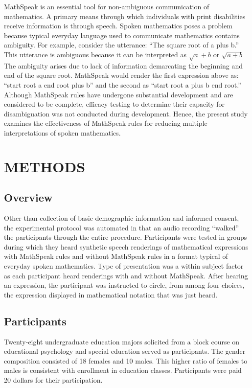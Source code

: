 \documentclass[11.5pt]{sig-alternate} %
\begin{document}
\begin{large}
MathSpeak is an essential tool for non-ambiguous communication of mathematics. A primary means through which individuals with print disabilities receive information is through speech. Spoken mathematics poses a problem because typical everyday language used to communicate mathematics contains ambiguity. For example, consider the utterance: “The square root of a plus b.” This utterance is ambiguous because it can be interpreted as $\sqrt{a}+b$ or $\sqrt{a+b}$ The ambiguity arises due to lack of information demarcating the beginning and end of the square root. MathSpeak would render the first expression above as: “start root a end root plus b” and the second as “start root a plus b end root.” Although MathSpeak rules have undergone substantial development and are considered to be complete, efficacy testing to determine their capacity for disambiguation was not conducted during development. Hence, the present study examines the effectiveness of MathSpeak rules for reducing multiple interpretations of spoken mathematics.

\section*{METHODS}
\subsection*{Overview}
Other than collection of basic demographic information and informed consent, the experimental protocol was automated in that an audio recording “walked” the participants through the entire procedure. Participants were tested in groups during which they heard synthetic speech renderings of mathematical expressions with MathSpeak rules and without MathSpeak rules in a format typical of everyday spoken mathematics. Type of presentation was a within subject factor as each participant heard renderings with and without MathSpeak. After hearing an expression, the participant was instructed to circle, from among four choices, the expression displayed in mathematical notation that was just heard.


\subsection*{Participants}
Twenty-eight undergraduate education majors solicited from a block course on educational psychology and special education served as participants. The gender composition consisted of 18 females and 10 males. This higher ratio of females to males is consistent with enrollment in education classes. Participants were paid 20 dollars for their participation.


\end{large}
\end{document}
